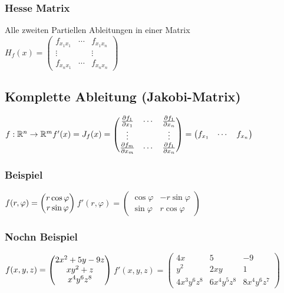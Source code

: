 \documentclass[a4paper,portrait]{scrartcl}
\begin{document}
\subsubsection{Hesse Matrix}
Alle zweiten Partiellen Ableitungen in einer Matrix \\
$H_f(x) = 
\begin{pmatrix}
	f_{x_1x_1} & \cdots & f_{x_1x_n}   \\
	\vdots &  & \vdots  \\
	f_{x_nx_1} & \cdots & f_{x_nx_n} 
\end{pmatrix}
$
\subsection{Komplette Ableitung (Jakobi-Matrix)}
$ f: \mathbb{R}^n \rightarrow \mathbb{R}^m \\
f'(x) = J_f(x) =
\begin{pmatrix}
	\frac{\partial f_1}{\partial x_1} & \cdots & \frac{\partial f_1}{\partial x_n}  \\
	\vdots &  & \vdots  \\
	\frac{\partial f_m}{\partial x_m} & \cdots & \frac{\partial f_1}{\partial x_n} 
\end{pmatrix} =
\begin{pmatrix}
	f_{x_1} & \cdots & f_{x_n}
\end{pmatrix}
$
\subsubsection{Beispiel}
$ f(r,\varphi) =
\begin{pmatrix}
	r \cos \varphi \\
	r \sin \varphi
\end{pmatrix} \\
$$
f'(r, \varphi) =
\begin{pmatrix}
	\cos \varphi & -r \sin \varphi\\
	\sin \varphi & r \cos \varphi
\end{pmatrix}
$
\subsubsection*{Nochn Beispiel}
$ f(x,y,z) =
\begin{pmatrix}
2x^2+5y-9z \\
xy^2+z \\
x^4y^6z^8
\end{pmatrix} \\
$$
f'(x,y,z) =
\begin{pmatrix}
4x & 5 & -9\\
y^2 & 2xy & 1 \\
4x^3y^6z^8 & 6x^4y^5z^8 & 8x^4y^6z^7
\end{pmatrix}
$
\end{document}
